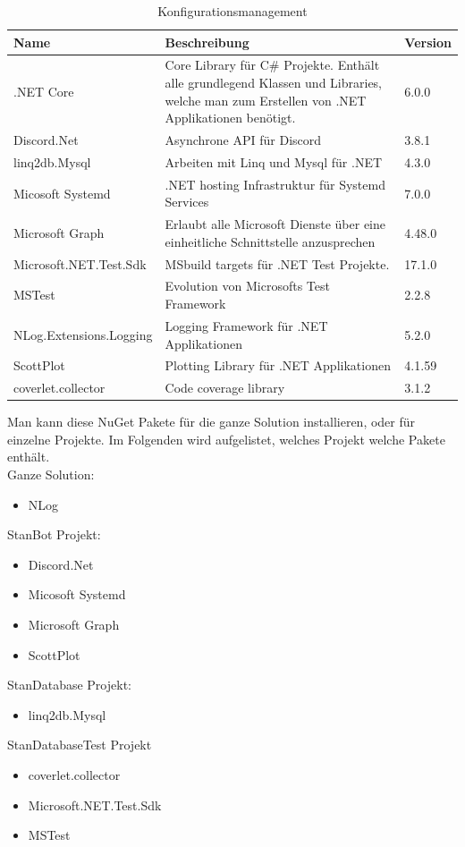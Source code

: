 \documentclass[a4paper, table]{article}
\begin{document}
\begin{table}[h]
    \centering
    \begin{tabular}{|l|p{20em}|l|}
        \hline
        \rowcolor[gray]{.9} Name & Beschreibung & Version \\
        \hline
        .NET Core & Core Library für C\# Projekte.
        Enthält alle grundlegend Klassen und Libraries, welche man zum Erstellen von .NET Applikationen benötigt. & 6.0.0 \\
        \hline
        Discord.Net & Asynchrone API für Discord & 3.8.1 \\
        \hline
        linq2db.Mysql & Arbeiten mit Linq und Mysql für .NET & 4.3.0 \\
        \hline
        Micosoft Systemd & .NET hosting Infrastruktur für Systemd Services & 7.0.0 \\
        \hline
        Microsoft Graph & Erlaubt alle Microsoft Dienste über eine einheitliche Schnittstelle anzusprechen & 4.48.0 \\
        \hline
        Microsoft.NET.Test.Sdk & MSbuild targets für .NET Test Projekte. & 17.1.0 \\
        \hline
        MSTest & Evolution von Microsofts Test Framework & 2.2.8 \\
        \hline
        NLog.Extensions.Logging & Logging Framework für .NET Applikationen & 5.2.0 \\
        \hline
        ScottPlot & Plotting Library für .NET Applikationen & 4.1.59 \\
        \hline
        coverlet.collector & Code coverage library & 3.1.2 \\
        \hline
    \end{tabular}
    \caption{Konfigurationsmanagement}
    \label{tab: Konfigurationsmanagement}
\end{table}

Man kann diese NuGet Pakete für die ganze Solution installieren, oder für einzelne Projekte.
Im Folgenden wird aufgelistet, welches Projekt welche Pakete enthält.\\
Ganze Solution:
\begin{itemize}
    \item NLog
\end{itemize}
StanBot Projekt:
\begin{itemize}
    \item Discord.Net
    \item Micosoft Systemd
    \item Microsoft Graph
    \item ScottPlot
\end{itemize}
StanDatabase Projekt:
\begin{itemize}
    \item linq2db.Mysql
\end{itemize}
StanDatabaseTest Projekt
\begin{itemize}
    \item coverlet.collector
    \item Microsoft.NET.Test.Sdk
    \item MSTest
\end{itemize}
\end{document}

